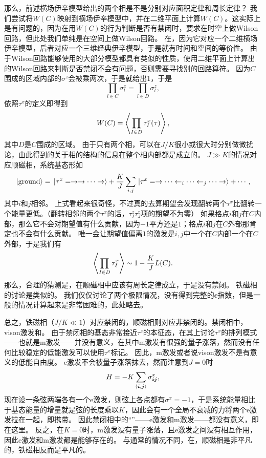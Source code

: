 那么，前述横场伊辛模型给出的两个相是不是分别对应面积定律和周长定律？
我们尝试将$W(C)$映射到横场伊辛模型中，并在二维平面上计算$W(C)$。这实际上是有问题的，因为在用$W(C)$的行为判断是否有禁闭时，要求在时空上做Wilson回路，但此处我们单纯是在空间上做Wilson回路。
在，因为它对应一个二维横场伊辛模型，后者对应一个三维经典伊辛模型，于是就有时间和空间的等价性。
由于Wilson回路能够使用的大部分模型都具有类似的性质，使用二维平面上计算出的Wilson回路来判断是否禁闭不会有问题，否则需要寻找别的回路算符。
因为$C$围成的区域内部的$\sigma^z$会被乘两次，于是就给出$1$，于是
\[
    \prod_{l \in C} \sigma^z_l = \prod_{l \in D} \sigma^z_l,
\]
依照$\tau^x$的定义即得到
\begin{equation}
    W(C) = \expval{\prod_{I \in D} \tau^x_I(\tau)},
\end{equation}
其中$D$是$C$围成的区域。
由于只有两个相，可以在$J/K$很小或很大时分别做微扰论，由此得到的关于相的结构的信息在整个相内部都是成立的。
$J \gg K$的情况对应顺磁相，系统基态形如
\[
    \ket*{\text{ground}} = \ket*{\tau^x = \rightarrow \rightarrow \cdots \rightarrow} + \frac{K}{J} \sum_{i, j} \ket*{\tau^x = \rightarrow \cdots \leftarrow_i \cdots \leftarrow_j \cdots \rightarrow} + \cdots,
\]
其中$i$和$j$相邻。
上式看起来很奇怪，不过真的去算期望会发现翻转两个$\tau^x$比翻转一个能量更低。（翻转相邻的两个${\tau}^x$的话，${\tau}^z_I {\tau}^z_J$项的期望不为零）
如果格点$i$和$j$在$C$内部，那么它不会对期望值有什么贡献，因为$-1$平方还是$1$；格点$i$和$j$在$C$外部那肯定也不会有什么贡献。
唯一会让期望值偏离$1$的激发是$i, j$中一个在$C$内部一个在$C$外部，于是我们有
\[
    \expval{\prod_{I \in D} {\tau}^x_I} \sim 1 - \frac{K}{J} L(C).
\]
那么，合理的猜测是，在顺磁相中应该有周长定律成立，于是没有禁闭。
铁磁相的讨论是类似的。 %
我们仅仅讨论了两个极限情况，没有得到完整的$\ee$指数，但是一般的情况计算起来是非常困难的，此处略去。

总之，铁磁相（$J / K \ll 1$）对应禁闭的，顺磁相则对应非禁闭的。禁闭相中，vison激发和。
由于禁闭相的基态非常接近${\tau}^z$的本征态，在其上讨论${\tau}^x$的排列模式——也就是m激发——并没有意义，在其中m激发有很强的量子涨落，然而没有任何比较稳定的低能激发可以使用$\tau^x$标记。
因此，m激发或者说vison激发不是有意义的低能自由度。
e激发不会被量子涨落抹去，然而注意到$J=0$时
\[
    H = - K \sum_{\langle \vb*{i}, \vb*{j} \rangle} \sigma^x_{\vb*{i} \vb*{j}},
\]
现在设一条弦两端各有一个e激发，则弦上各点都有$\sigma^x = -1$，于是系统能量相比于基态能量的增量就是弦的长度乘以$K$，因此会有一个全局不衰减的力将两个e激发拉在一起，即携带。
因此禁闭相中的“”——e激发和m激发——都没有意义，即在这里。
反之，在$K=0$时，m激发没有量子涨落，且e激发之间没有相互作用，因此e激发和m激发都是能够存在的。
与通常的情况不同，在，顺磁相是非平凡的，铁磁相反而是平凡的。

